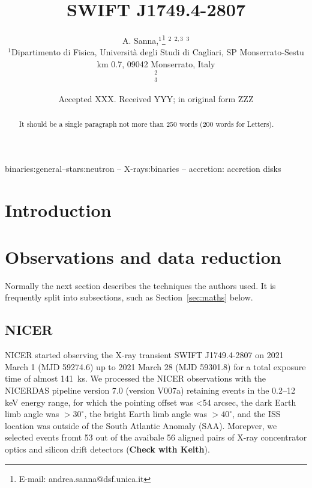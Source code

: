 \documentclass[fleqn,usenatbib]{mnras}
\title[Short title, max. 45 characters]{SWIFT J1749.4-2807}
\author[Sanna et al.]{
A. Sanna,$^{1}$\thanks{E-mail: andrea.sanna@dsf.unica.it}
$^{2}$
$^{2,3}$
$^{3}$
\\
$^{1}$Dipartimento di Fisica, Università degli Studi di Cagliari, SP Monserrato-Sestu km 0.7, 09042 Monserrato, Italy\\
$^{2}$\\
$^{3}$
}
\date{Accepted XXX. Received YYY; in original form ZZZ}
\newcommand{\swiftj}{SWIFT J1749.4-2807}	%
\begin{document}
\label{firstpage}
\pagerange{\pageref{firstpage}--\pageref{lastpage}}
\maketitle

\begin{abstract}
It should be a single paragraph not more than 250 words (200 words for Letters).
\end{abstract}

\begin{keywords}
binaries:general–stars:neutron – X-rays:binaries – accretion: accretion disks
\end{keywords}



\section{Introduction}


\section{Observations and data reduction}

Normally the next section describes the techniques the authors used.
It is frequently split into subsections, such as Section~\ref{sec:maths} below.

\subsection{NICER}

NICER \citep{2012SPIE.8443E..13G} started observing the X-ray transient \swiftj{} on 2021 March 1 (MJD 59274.6) up to 2021 March 28 (MJD 59301.8) for a total exposure time of almost 141~ks. We processed the NICER observations with the NICERDAS pipeline version 7.0 (version V007a) retaining events in the 0.2–12 keV energy range, for which the pointing offset was <54 arcsec, the dark Earth limb angle was $>30^\circ$, the bright Earth limb angle was $>40^\circ$, and the ISS location was outside of the South Atlantic Anomaly (SAA). Morepver, we selected events fromt 53 out of the avaibale 56 aligned pairs of X-ray concentrator optics and silicon drift detectors (\textbf{Check with Keith}).
\end{document}
